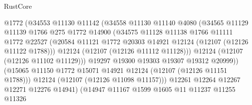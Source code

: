 \begin{lexlean}{RustCore}
\begin{coremodule}
                              @1772
                              (@34553
                                @11130
                                @11142
                                (@34558
                                  @11130
                                  @11140
                                  @4080
                                  (@34565
                                    @11129
                                    @11139
                                    @1766
                                    @275
                                    @1772
                                    @14900
                                    (@34575
                                      @11128
                                      @11138
                                      @1766
                                      @11111
                                      @1772
                                      @22527
                                      (@20584
                                        @11121
                                        @1772
                                        @20303
                                        @14921
                                        @12124
                                        (@12107 (@12126 @11122 @1788)))
                                      @12124
                                      (@12107 (@12126 @11112 @11128)))
                                    @12124
                                    (@12107 (@12126 @11102 @11129)))
                                  @19297
                                  @19300
                                  @19303
                                  @19307
                                  @19312
                                  @20999))
                              (@15065
                                @11150
                                @1772
                                @15071
                                @14921
                                @12124
                                (@12107 (@12126 @11151 @1788)))
                              @12124
                              (@12107 (@12126 @11098 @11157)))
                            @12261
                            @12264
                            @12267
                            @12271
                            @12276
                            @14941)
                          (@14947
                            @11167
                            @1599
                            @1605
                            @11
                            @11237
                            @11255
                            @11326

\end{coremodule}
\end{lexlean}
